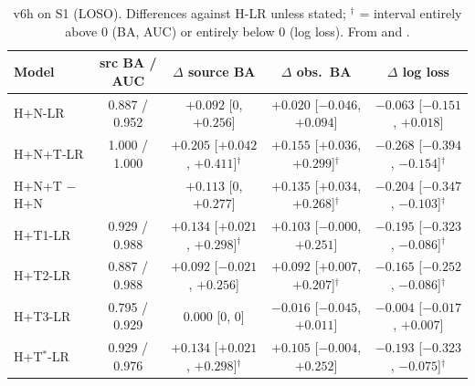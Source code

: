 \begin{table}[htbp]
\centering\footnotesize
\caption[v6h robustness]{\Descriptive{} v6h on S1 (LOSO). Differences against H-LR unless stated; $^\dagger$ = interval
entirely above 0 (BA, AUC) or entirely below 0 (log loss). From  and
.}
\label{tab:p3robust}
\setlength{\tabcolsep}{2.5pt}
\begin{tabular}{@{}lcccc@{}}
\toprule
Model & src BA / AUC & $\Delta$ source BA & $\Delta$ obs.\ BA & $\Delta$ log loss \\
\midrule
H+N-LR & 0.887 / 0.952 & $+0.092$ [0, $+0.256$] & $+0.020$ [$-0.046$, $+0.094$] & $-0.063$ [$-0.151$, $+0.018$] \\
H+N+T-LR & 1.000 / 1.000 & $+0.205$ [$+0.042$, $+0.411$]$^\dagger$ & $+0.155$ [$+0.036$, $+0.299$]$^\dagger$ & $-0.268$ [$-0.394$, $-0.154$]$^\dagger$ \\
H+N+T $-$ H+N & & $+0.113$ [0, $+0.277$] & $+0.135$ [$+0.034$, $+0.268$]$^\dagger$ & $-0.204$ [$-0.347$, $-0.103$]$^\dagger$ \\
H+T1-LR & 0.929 / 0.988 & $+0.134$ [$+0.021$, $+0.298$]$^\dagger$ & $+0.103$ [$-0.000$, $+0.251$] & $-0.195$ [$-0.323$, $-0.086$]$^\dagger$ \\
H+T2-LR & 0.887 / 0.988 & $+0.092$ [$-0.021$, $+0.256$] & $+0.092$ [$+0.007$, $+0.207$]$^\dagger$ & $-0.165$ [$-0.252$, $-0.086$]$^\dagger$ \\
H+T3-LR & 0.795 / 0.929 & $0.000$ [0, 0] & $-0.016$ [$-0.045$, $+0.011$] & $-0.004$ [$-0.017$, $+0.007$] \\
H+T$^*$-LR & 0.929 / 0.976 & $+0.134$ [$+0.021$, $+0.298$]$^\dagger$ & $+0.105$ [$-0.004$, $+0.252$] & $-0.193$ [$-0.323$, $-0.075$]$^\dagger$ \\
\bottomrule
\end{tabular}
\end{table}

